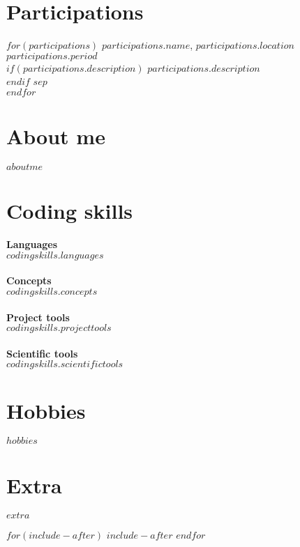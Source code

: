 \documentclass[
$if(fontsize)$
    $fontsize$,
$endif$
$if(lang)$
    $babel-lang$,
$endif$
$if(papersize)$
    $papersize$paper,
$endif$
$for(classoption)$
    $classoption$$sep$,
$endfor$
]{$documentclass$}
\begin{document}
\section{Participations}
\footnotesize
\begin{adjustwidth}{3cm}{0cm}
    $for(participations)$
    \textbf{$participations.name$}, $participations.location$\hfill \textit{$participations.period$}\\
        $if(participations.description)$
            $participations.description$\\
        $endif$
        $sep$\\
    $endfor$
\end{adjustwidth}

\section{About me}
\footnotesize
\begin{adjustwidth}{3cm}{0cm}
    $aboutme$
\end{adjustwidth}

\section{Coding skills}
\footnotesize
\begin{adjustwidth}{3cm}{0cm}
    \textbf{Languages}\\
    $codingskills.languages$\\\\
    \textbf{Concepts}\\
    $codingskills.concepts$\\\\
    \textbf{Project tools}\\
    $codingskills.projecttools$\\\\
    \textbf{Scientific tools}\\
    $codingskills.scientifictools$
\end{adjustwidth}

\section{Hobbies}
\footnotesize
\begin{adjustwidth}{3cm}{0cm}
    $hobbies$
\end{adjustwidth}

\section{Extra}
\footnotesize
\begin{adjustwidth}{3cm}{0cm}
    $extra$
\end{adjustwidth}

$for(include-after)$
    $include-after$
$endfor$

\end{document}
